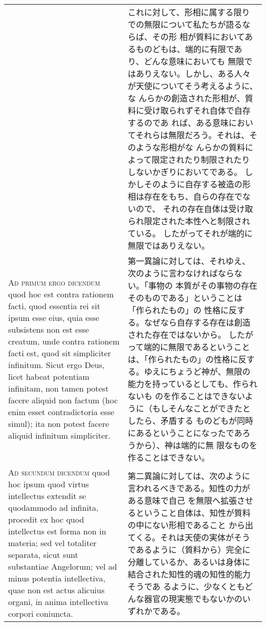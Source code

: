\documentclass[10pt]{jsarticle} %
\begin{document}
\begin{longtable}{p{21em}p{21em}}
&

これに対して、形相に属する限りでの無限について私たちが語るならば、その形
 相が質料においてあるものどもは、端的に有限であり、どんな意味においても
 無限ではありえない。しかし、ある人々が天使についてそう考えるように、な
 んらかの創造された形相が、質料に受け取られずそれ自体で自存するのであ
 れば、ある意味においてそれらは無限だろう。それは、そのような形相がな
 んらかの質料によって限定されたり制限されたりしないかぎりにおいてである。
 しかしそのように自存する被造の形相は存在をもち、自らの存在でないので、
それの存在自体は受け取られ限定された本性へと制限されている。
 したがってそれが端的に無限ではありえない。


\\


{\scshape Ad primum ergo dicendum} quod hoc est contra rationem facti, quod
essentia rei sit ipsum esse eius, quia esse subsistens non est esse
creatum, unde contra rationem facti est, quod sit simpliciter
infinitum. Sicut ergo Deus, licet habeat potentiam infinitam, non tamen
potest facere aliquid non factum (hoc enim esset contradictoria esse
simul); ita non potest facere aliquid infinitum simpliciter.

&

第一異論に対しては、それゆえ、次のように言わなければならない。「事物の
 本質がその事物の存在そのものである」ということは「作られたもの」の
性格に反する。なぜなら自存する存在は創造された存在ではないから。
 したがって端的に無限であるということは、「作られたもの」の性格に反す
 る。ゆえにちょうど神が、無限の能力を持っているとしても、作られないも
 のを作ることはできないように（もしそんなことができたとしたら、矛盾する
 ものどもが同時にあるということになったであろうから）、神は端的に無
 限なものを作ることはできない。

\\

{\scshape Ad secundum dicendum} quod hoc ipsum quod virtus intellectus extendit se
quodammodo ad infinita, procedit ex hoc quod intellectus est forma non
in materia; sed vel totaliter separata, sicut sunt substantiae
Angelorum; vel ad minus potentia intellectiva, quae non est actus
alicuius organi, in anima intellectiva corpori coniuncta.

&

第二異論に対しては、次のように言われるべきである。知性の力がある意味で自己
 を無限へ拡張させるということ自体は、知性が質料の中にない形相であること
 から出てくる。それは天使の実体がそうであるように（質料から）完全に
 分離しているか、あるいは身体に結合された知性的魂の知性的能力そうであ
 るように、少なくともどんな器官の現実態でもないかのいずれかである。



\end{longtable}
\end{document}
